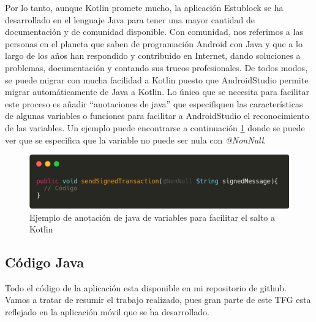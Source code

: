 Por lo tanto, aunque Kotlin promete mucho, la aplicación Estublock se ha desarrollado en el lenguaje Java para tener una mayor cantidad de documentación y de comunidad disponible. Con comunidad, nos referimos a las personas en el planeta que saben de programación Android con Java y que a lo largo de los años han respondido y contribuido en Internet, dando soluciones a problemas, documentación y contando sus trucos profesionales. De todos modos, se puede migrar con mucha facilidad a Kotlin puesto que AndroidStudio permite migrar automáticamente de Java a Kotlin. Lo único que se necesita para facilitar este proceso es añadir ``anotaciones de java'' que especifiquen las características de algunas variables o funciones para facilitar a AndroidStudio el reconocimiento de las variables. Un ejemplo puede encontrarse a continuación \ref{fig:nonNull} donde se puede ver que se especifica que la variable no puede ser nula con \emph{@NonNull}.


\begin{figure}[h!]
  \centering
  \includegraphics[width=0.9\linewidth]{figs/Desarrollo/nonNull}
  \caption[Facilitar el salto a Kotlin]{Ejemplo de anotación de java de variables para facilitar el salto a Kotlin}
  \label{fig:nonNull}
\end{figure}


\subsection{Código Java}

Todo el código de la aplicación esta disponible en mi repositorio de github\cite{forgis98}. Vamos a tratar de resumir el trabajo realizado, pues gran parte de este TFG esta reflejado en la aplicación móvil que se ha desarrollado. \\

